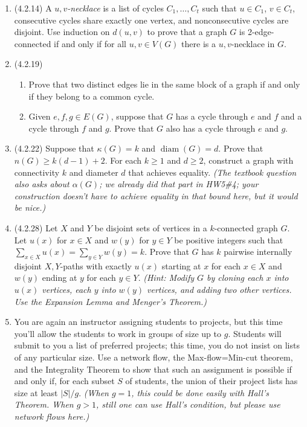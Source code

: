 \documentclass[11pt]{amsart}%
\DeclareMathOperator{\diam}{diam}
\begin{document}
\begin{enumerate}
\item (4.2.14) A \emph{$u,v$-necklace} is a list of cycles $C_1, \dotsc, C_t$ such that $u\in C_1$, $v\in C_t$, consecutive cycles share exactly one vertex, and nonconsecutive cycles are disjoint.  Use induction on $d(u,v)$ to prove that a graph $G$ is 2-edge-connected if and only if for all $u,v\in V(G)$ there is a $u,v$-necklace in $G$.

\item (4.2.19)
\begin{enumerate}
\item Prove that two distinct edges lie in the same block of a graph if and only if they belong to a common cycle.
\item Given $e,f,g\in E(G)$, suppose that $G$ has a cycle through $e$ and $f$ and a cycle through $f$ and $g$.  Prove that $G$ also has a cycle through $e$ and $g$.
\end{enumerate}

\item (4.2.22) Suppose that $\kappa(G)=k$ and $\diam(G)=d$.  Prove that $n(G)\geq k(d-1)+2$.  For each $k\geq1$ and $d\geq2$, construct a graph with connectivity $k$ and diameter $d$ that achieves equality.  \textit{(The textbook question also asks about $\alpha(G)$; we already did that part in HW5\#4; your construction doesn't have to achieve equality in that bound here, but it would be nice.)}

\item (4.2.28) Let $X$ and $Y$ be disjoint sets of vertices in a $k$-connected graph $G$.  Let $u(x)$ for $x\in X$ and $w(y)$ for $y\in Y$ be positive integers such that $\sum_{x\in X} u(x)=\sum_{y\in Y} w(y)=k$.  Prove that $G$ has $k$ pairwise internally disjoint $X,Y$-paths with exactly $u(x)$ starting at $x$ for each $x\in X$ and $w(y)$ ending at $y$ for each $y\in Y$.
\textit{(Hint: Modify $G$ by cloning each $x$ into $u(x)$ vertices, each $y$ into $w(y)$ vertices, and adding two other vertices.  Use the Expansion Lemma and Menger's Theorem.)}


\item You are again an instructor assigning students to projects, but this time you'll allow the students to work in groups of size up to $g$.  Students will submit to you a list of preferred projects; this time, you do not insist on lists of any particular size.  Use a network flow, the Max-flow=Min-cut theorem, and the Integrality Theorem to show that such an assignment is possible if and only if, for each subset $S$ of students, the union of their project lists has size at least $|S|/g$.  \textit{(When $g=1$, this could be done easily with Hall's Theorem.  When $g>1$, still one can use Hall's condition, but please use network flows here.)}


\end{enumerate}
\end{document}
